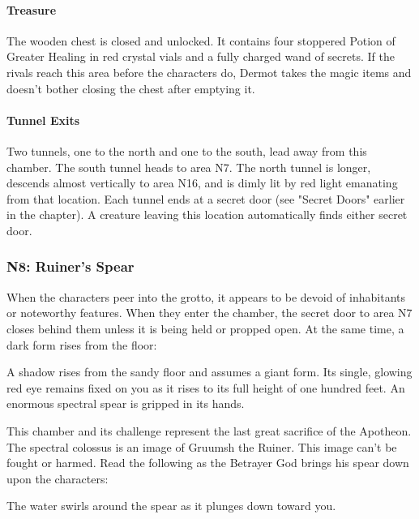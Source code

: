 \documentclass[10pt,a4,twoside,twocolumn,openany,nodeprecatedcode]{dndbook}
\begin{document}
\paragraph{Treasure}
The wooden chest is closed and unlocked. It contains four stoppered Potion of Greater Healing in red crystal vials and a fully charged wand of secrets. If the rivals reach this area before the characters do, Dermot takes the magic items and doesn't bother closing the chest after emptying it.
\paragraph{Tunnel Exits}
Two tunnels, one to the north and one to the south, lead away from this chamber. The south tunnel heads to area N7. The north tunnel is longer, descends almost vertically to area N16, and is dimly lit by red light emanating from that location. Each tunnel ends at a secret door (see "Secret Doors" earlier in the chapter). A creature leaving this location automatically finds either secret door.
\subsubsection{N8: Ruiner's Spear}
When the characters peer into the grotto, it appears to be devoid of inhabitants or noteworthy features. When they enter the chamber, the secret door to area N7 closes behind them unless it is being held or propped open. At the same time, a dark form rises from the floor:
\begin{DndReadAloud}{}
A shadow rises from the sandy floor and assumes a giant form. Its single, glowing red eye remains fixed on you as it rises to its full height of one hundred feet. An enormous spectral spear is gripped in its hands.
\end{DndReadAloud}

This chamber and its challenge represent the last great sacrifice of the Apotheon. The spectral colossus is an image of Gruumsh the Ruiner. This image can't be fought or harmed. Read the following as the Betrayer God brings his spear down upon the characters:
\begin{DndReadAloud}{}
The water swirls around the spear as it plunges down toward you.
\end{DndReadAloud}
\end{document}
